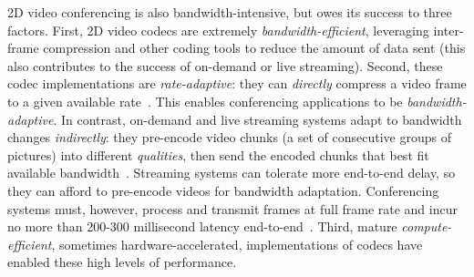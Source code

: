 %
2D video conferencing is also bandwidth-intensive, but owes its success to three factors.
%
First, 2D video codecs are extremely \textit{bandwidth-efficient}, leveraging inter-frame compression and other coding tools to reduce the amount of data sent (this also contributes to the success of on-demand or live streaming).
%
%
Second, these codec implementations are \textit{rate-adaptive}: they can \textit{directly} compress a video frame to a given available rate~\cite{salsify, videoconf-benchmark}.
%
This enables conferencing applications to be \textit{bandwidth-adaptive}.
%
In contrast, on-demand and live streaming systems adapt to bandwidth changes \textit{indirectly}: they pre-encode video chunks (a set of consecutive groups of pictures) into different \textit{qualities}, then send the encoded chunks that best fit available bandwidth~\cite{bb,bola,festive,oboe}.
%
%
Streaming systems can tolerate more end-to-end delay, so they can afford to pre-encode videos for bandwidth adaptation. 
%
Conferencing systems must, however, process and transmit frames at full frame rate and incur no more than 200-300 millisecond latency end-to-end~\cite{videoconf-benchmark,salsify,converge-sigcomm-2023,rfec-acm-mm2022}.
%
Third, mature \textit{compute-efficient}, sometimes hardware-accelerated, implementations of codecs have enabled these high levels of performance.


